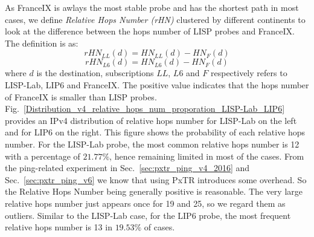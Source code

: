 As FranceIX is awlays the most stable probe and has the shortest path in most cases, we define \emph{Relative Hops Number (rHN)} clustered by different continents to look at the difference between the hops number of LISP probes and FranceIX. The definition is as: %
\begin{equation}
    \label{rHN_ll_2016}
    rHN_{LL}(d)=HN_{LL}(d) - HN_{F}(d) 
\end{equation}
\begin{equation}
    \label{rHN_l6_2016}
    rHN_{L6}(d)=HN_{L6}(d) - HN_{F}(d) 
\end{equation}
where $d$ is the destination, subscriptions $LL$, $L6$ and $F$ respectively refers to LISP-Lab, LIP6 and FranceIX. The positive value indicates that the hops number of FranceIX is smaller than LISP probes. Fig.~\ref{Distribution_v4_relative_hops_num_proporation_LISP-Lab_LIP6} provides an IPv4 distribution of relative hops number for LISP-Lab on the left and for LIP6 on the right. This figure shows the probability of each relative hops number. For the LISP-Lab probe, the most common relative hops number is 12 with a percentage of $21.77\%$, hence remaining limited in most of the cases. From the ping-related experiment in Sec.~\ref{sec:pxtr_ping_v4_2016} and Sec.~\ref{sec:pxtr_ping_v6} we know that using PxTR introduces some overhead. So the Relative Hops Number being generally positive is reasonable. The very large relative hops number just appears once for 19 and 25, so we regard them as outliers. Similar to the LISP-Lab case, for the LIP6 probe, the most frequent relative hops number is 13 in $19.53\%$ of cases.

